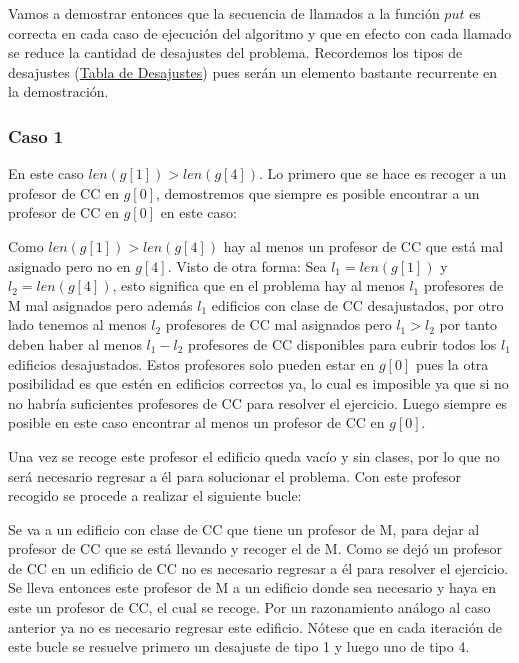 \documentclass[11pt]{article}
\begin{document}
    Vamos a demostrar entonces que la secuencia de llamados a la función $put$ es correcta en cada caso de ejecución
    del algoritmo y que en efecto con cada llamado se reduce la cantidad de desajustes del problema. Recordemos los 
    tipos de desajustes (\hyperref[Tabla_de_Desajustes]{Tabla de Desajustes}) pues serán un elemento bastante 
    recurrente en la demostración.

    \subsubsection{Caso 1}
    En este caso $len(g[1]) > len(g[4])$. Lo primero que se hace es recoger a un profesor de CC en $g[0]$, demostremos que siempre
    es posible encontrar a un profesor de CC en $g[0]$ en este caso:

    Como $len(g[1]) > len(g[4])$ hay al menos un profesor de CC que está mal asignado pero no en $g[4]$. Visto de otra forma:
    Sea $l_1 = len(g[1])$ y $l_2 = len(g[4])$, esto significa que en el problema hay al menos $l_1$ profesores de M mal asignados
    pero además $l_1$ edificios con clase de CC desajustados, por otro lado tenemos al menos $l_2$ profesores de CC mal asignados pero
    $l_1 > l_2$ por tanto deben haber al menos $l_1 - l_2$ profesores de CC disponibles para cubrir todos los $l_1$ edificios desajustados.
    Estos profesores solo pueden estar en $g[0]$ pues la otra posibilidad es que estén en edificios correctos ya, lo cual es imposible
    ya que si no no habría suficientes profesores de CC para resolver el ejercicio. Luego siempre es posible en este caso encontrar al
    menos un profesor de CC en $g[0]$.

    Una vez se recoge este profesor el edificio queda vacío y sin clases, por lo que no será necesario regresar a él para solucionar el
    problema. Con este profesor recogido se procede a realizar el siguiente bucle:

    Se va a un edificio con clase de CC que tiene un profesor de M, para dejar al profesor de CC que se está llevando y recoger el de M.
    Como se dejó un profesor de CC en un edificio de CC no es necesario regresar a él para resolver el ejercicio. Se lleva entonces este 
    profesor de M a un edificio donde sea necesario y haya en este un profesor de CC, el cual se recoge. Por un razonamiento análogo al 
    caso anterior ya no es necesario regresar este edificio. Nótese que en cada iteración de este bucle se resuelve primero un desajuste 
    de tipo 1 y luego uno de tipo 4.
\end{document}
